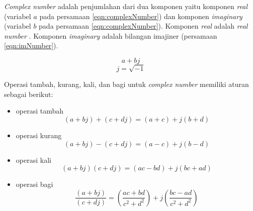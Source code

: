 {\it Complex number} adalah penjumlahan dari dua komponen yaitu komponen {\it real} (variabel $a$ pada persamaan \ref{eqn:complexNumber}) dan komponen {\it imaginary} (variabel $b$ pada persamaan \ref{eqn:complexNumber}). Komponen {\it real} adalah {\it real number} . Komponen {\it imaginary} adalah bilangan imajiner (persamaan \ref{eqn:imNumber}).

	\begin{equation}\label{eqn:complexNumber}
		a + bj 
	\end{equation}  
	\begin{equation}\label{eqn:imNumber}
		j = \sqrt{-1}
	\end{equation}

Operasi tambah, kurang, kali, dan bagi untuk {\it complex number} memiliki aturan sebagai berikut:
\begin{itemize}
	\item operasi tambah
		\begin{equation}\label{eqn:complexNumberTambah}
			(a + bj) + (c + dj) = (a + c) + j(b + d)
		\end{equation}  
	\item operasi kurang
		\begin{equation}\label{eqn:complexNumberKurang}
			(a + bj) - (c + dj) = (a - c) + j(b - d)
		\end{equation}
	\item operasi kali
		\begin{equation}\label{eqn:complexNumberKali}
			(a + bj)(c + dj) = (ac - bd) + j(bc + ad)
		\end{equation}
	\item operasi bagi
		\begin{equation}\label{eqn:complexNumberBagi}
			\frac{(a + bj)}{(c + dj)} = (\frac{ac + bd}{c^2 + d^2}) + j(\frac{bc - ad}{c^2 + d^2})
		\end{equation}
\end{itemize}

